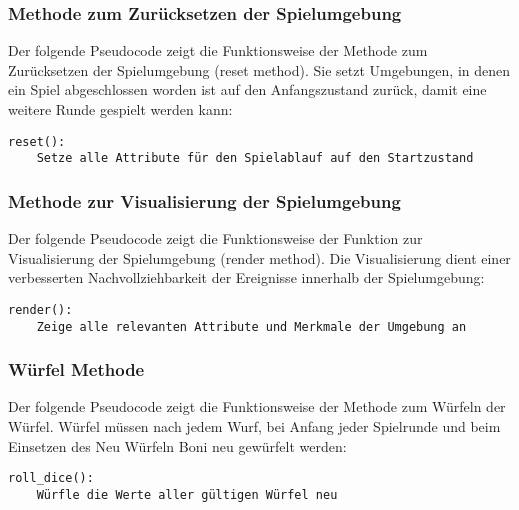 \subsubsection{Methode zum Zurücksetzen der Spielumgebung}
\begin{minipage}{\linewidth}
Der folgende Pseudocode zeigt die Funktionsweise der Methode zum Zurücksetzen der Spielumgebung (reset method). Sie setzt Umgebungen, in denen ein Spiel abgeschlossen worden ist auf den Anfangszustand zurück, damit eine weitere Runde gespielt werden kann:
\vspace{0.5cm}
\begin{lstlisting}[caption={Methode zum Zurücksetzen der Umgebung}]
reset():
	Setze alle Attribute für den Spielablauf auf den Startzustand
\end{lstlisting}
\end{minipage}

\subsubsection{Methode zur Visualisierung der Spielumgebung}
\begin{minipage}{\linewidth}
Der folgende Pseudocode zeigt die Funktionsweise der Funktion zur Visualisierung der Spielumgebung (render method). Die Visualisierung dient einer verbesserten Nachvollziehbarkeit der Ereignisse innerhalb der Spielumgebung:
\vspace{0.5cm}
\begin{lstlisting}[caption={Methode zur Visualisierung der Spielumgebung}]
render():
	Zeige alle relevanten Attribute und Merkmale der Umgebung an
\end{lstlisting}
\end{minipage}

\subsubsection{Würfel Methode}
\begin{minipage}{\linewidth}
Der folgende Pseudocode zeigt die Funktionsweise der Methode zum Würfeln der Würfel. Würfel müssen nach jedem Wurf, bei Anfang jeder Spielrunde und beim Einsetzen des Neu Würfeln Boni neu gewürfelt werden:
\vspace{0.5cm}
\begin{lstlisting}[caption={Würfel Methode}]
roll_dice():
	Würfle die Werte aller gültigen Würfel neu
\end{lstlisting}
\end{minipage}

